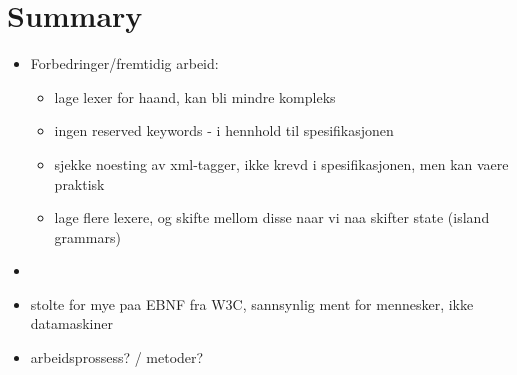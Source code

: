 \chapter{Summary}
\begin{itemize}
	\item Forbedringer/fremtidig arbeid:
	
	\begin{itemize}
		\item lage lexer for haand, kan bli mindre kompleks
		\item ingen reserved keywords - i hennhold til spesifikasjonen
		\item sjekke noesting av xml-tagger, ikke krevd i spesifikasjonen, men kan vaere praktisk
		\item lage flere lexere, og skifte mellom disse naar vi naa skifter state
		(island grammars)
	\end{itemize}
	
	\item \item stolte for mye paa EBNF fra W3C, sannsynlig ment for mennesker, ikke datamaskiner
	\item arbeidsprossess? / metoder?
\end{itemize}